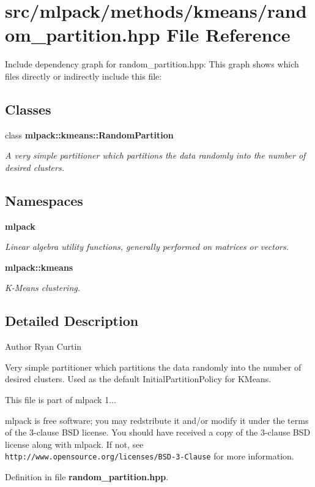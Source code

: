 \section{src/mlpack/methods/kmeans/random\-\_\-partition.hpp File Reference}
\label{random__partition_8hpp}
Include dependency graph for random\-\_\-partition.\-hpp\-:
This graph shows which files directly or indirectly include this file\-:
\subsection*{Classes}
\begin{DoxyCompactItemize}
\item 
class {\bf mlpack\-::kmeans\-::\-Random\-Partition}
\begin{DoxyCompactList}\small\item\em A very simple partitioner which partitions the data randomly into the number of desired clusters. \end{DoxyCompactList}\end{DoxyCompactItemize}
\subsection*{Namespaces}
\begin{DoxyCompactItemize}
\item 
{\bf mlpack}
\begin{DoxyCompactList}\small\item\em Linear algebra utility functions, generally performed on matrices or vectors. \end{DoxyCompactList}\item 
{\bf mlpack\-::kmeans}
\begin{DoxyCompactList}\small\item\em K-\/\-Means clustering. \end{DoxyCompactList}\end{DoxyCompactItemize}


\subsection{Detailed Description}
\begin{DoxyAuthor}{Author}
Ryan Curtin
\end{DoxyAuthor}
Very simple partitioner which partitions the data randomly into the number of desired clusters. Used as the default Initial\-Partition\-Policy for K\-Means.

This file is part of mlpack 1...

mlpack is free software; you may redstribute it and/or modify it under the terms of the 3-\/clause B\-S\-D license. You should have received a copy of the 3-\/clause B\-S\-D license along with mlpack. If not, see {\tt http\-://www.\-opensource.\-org/licenses/\-B\-S\-D-\/3-\/\-Clause} for more information. 

Definition in file {\bf random\-\_\-partition.\-hpp}.

